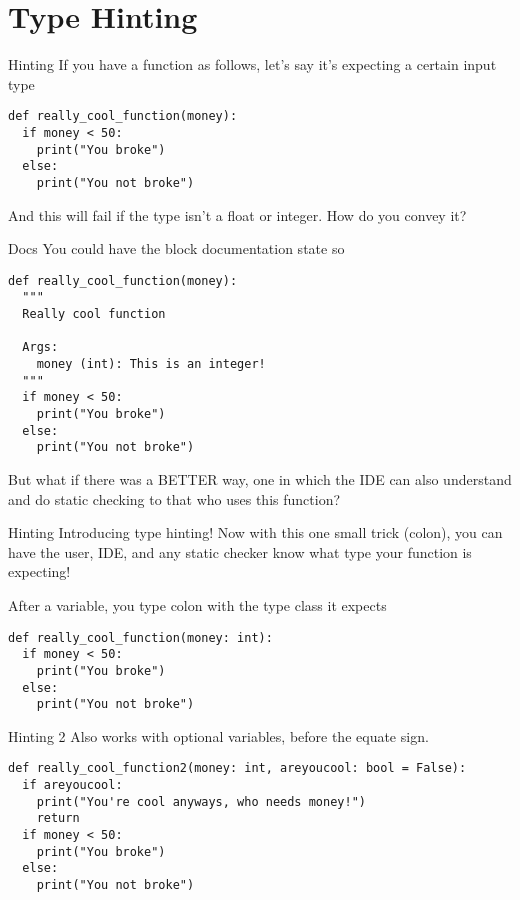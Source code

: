 \section{Type Hinting}
\begin{frame}[containsverbatim]{Hinting}
If you have a function as follows, let's say it's expecting a certain input type
\begin{verbatim}
def really_cool_function(money):
  if money < 50:
    print("You broke")
  else:
    print("You not broke")
\end{verbatim}
And this will fail if the type isn't a float or integer. How do you convey it?
\end{frame}

\begin{frame}[containsverbatim]{Docs}
You could have the block documentation state so
\begin{verbatim}
def really_cool_function(money):
  """
  Really cool function

  Args:
    money (int): This is an integer!
  """
  if money < 50:
    print("You broke")
  else:
    print("You not broke")
\end{verbatim}
But what if there was a BETTER way, one in which the IDE can also understand and do static checking to that who uses this function?
\end{frame}

\begin{frame}[containsverbatim]{Hinting}
Introducing type hinting! Now with this one small trick (colon), you can have the user, IDE, and any static checker know what type your function is expecting!

After a variable, you type colon with the type class it expects
\begin{verbatim}
def really_cool_function(money: int):
  if money < 50:
    print("You broke")
  else:
    print("You not broke")
\end{verbatim}
\end{frame}

\begin{frame}[containsverbatim]{Hinting 2}
Also works with optional variables, before the equate sign.
\begin{verbatim}
def really_cool_function2(money: int, areyoucool: bool = False):
  if areyoucool:
    print("You're cool anyways, who needs money!")
    return
  if money < 50:
    print("You broke")
  else:
    print("You not broke")
\end{verbatim}
\end{frame}

